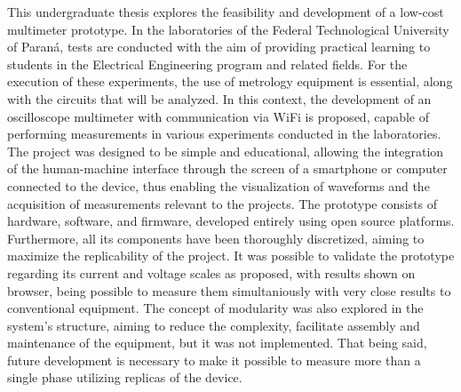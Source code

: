 
\begin{abstractutfpr}%
This undergraduate thesis explores the feasibility and development of a low-cost multimeter prototype. In the laboratories of the Federal Technological University of Paraná, tests are conducted with the aim of providing practical learning to students in the Electrical Engineering program and related fields. For the execution of these experiments, the use of metrology equipment is essential, along with the circuits that will be analyzed.
In this context, the development of an oscilloscope multimeter with communication via WiFi is proposed, capable of performing measurements in various experiments conducted in the laboratories. The project was designed to be simple and educational, allowing the integration of the human-machine interface through the screen of a smartphone or computer connected to the device, thus enabling the visualization of waveforms and the acquisition of measurements relevant to the projects.
The prototype consists of hardware, software, and firmware, developed entirely using open source platforms. Furthermore, all its components have been thoroughly discretized, aiming to maximize the replicability of the project.
It was possible to validate the prototype regarding its current and voltage scales as proposed, with results shown on browser, being possible to measure them simultaniously with very close results to conventional equipment.
The concept of modularity was also explored in the system's structure, aiming to reduce the complexity, facilitate assembly and maintenance of the equipment, but it was not implemented. That being said, future development is necessary to make it possible to measure more than a single phase utilizing replicas of the device.
\end{abstractutfpr}